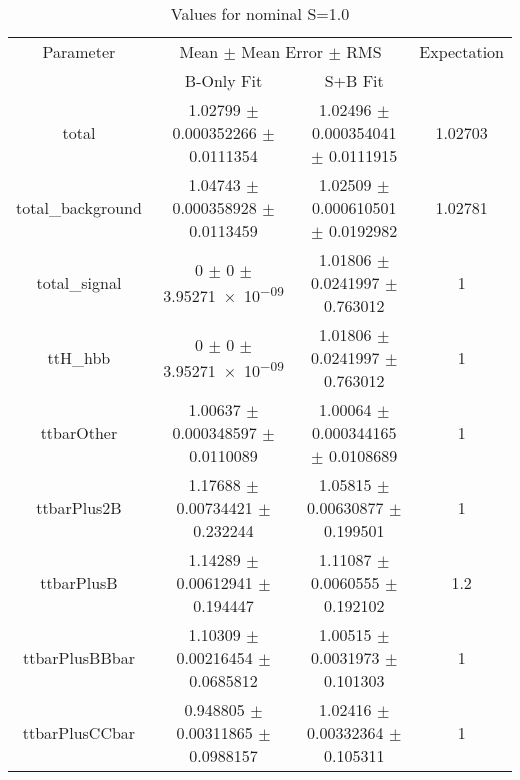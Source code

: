 \begin{table}
\centering
\caption{Values for nominal S=1.0}
\begin{tabular}{cccc}
\toprule
Parameter & \multicolumn{2}{c}{Mean $\pm$ Mean Error $\pm$ RMS} & Expectation\\
 & B-Only Fit & S+B Fit & \\
\midrule
total & \num{1.02799} $\pm$ \num{0.000352266} $\pm$ \num{0.0111354} & \num{1.02496} $\pm$ \num{0.000354041} $\pm$ \num{0.0111915} & \num{1.02703}\\
total\_background & \num{1.04743} $\pm$ \num{0.000358928} $\pm$ \num{0.0113459} & \num{1.02509} $\pm$ \num{0.000610501} $\pm$ \num{0.0192982} & \num{1.02781}\\
total\_signal & \num{0} $\pm$ \num{0} $\pm$ \num{3.95271e-09} & \num{1.01806} $\pm$ \num{0.0241997} $\pm$ \num{0.763012} & \num{1}\\
ttH\_hbb & \num{0} $\pm$ \num{0} $\pm$ \num{3.95271e-09} & \num{1.01806} $\pm$ \num{0.0241997} $\pm$ \num{0.763012} & \num{1}\\
ttbarOther & \num{1.00637} $\pm$ \num{0.000348597} $\pm$ \num{0.0110089} & \num{1.00064} $\pm$ \num{0.000344165} $\pm$ \num{0.0108689} & \num{1}\\
ttbarPlus2B & \num{1.17688} $\pm$ \num{0.00734421} $\pm$ \num{0.232244} & \num{1.05815} $\pm$ \num{0.00630877} $\pm$ \num{0.199501} & \num{1}\\
ttbarPlusB & \num{1.14289} $\pm$ \num{0.00612941} $\pm$ \num{0.194447} & \num{1.11087} $\pm$ \num{0.0060555} $\pm$ \num{0.192102} & \num{1.2}\\
ttbarPlusBBbar & \num{1.10309} $\pm$ \num{0.00216454} $\pm$ \num{0.0685812} & \num{1.00515} $\pm$ \num{0.0031973} $\pm$ \num{0.101303} & \num{1}\\
ttbarPlusCCbar & \num{0.948805} $\pm$ \num{0.00311865} $\pm$ \num{0.0988157} & \num{1.02416} $\pm$ \num{0.00332364} $\pm$ \num{0.105311} & \num{1}\\
\bottomrule
\end{tabular}
\end{table}